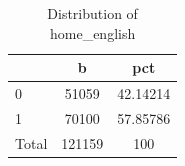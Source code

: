 \begin{table}[htbp]\centering
\def\sym#1{\ifmmode^{#1}\else\(^{#1}\)\fi}
\caption{Distribution of home\_english}
\begin{tabular}{l*{1}{cc}}
\hline\hline
                    &           b&         pct\\
\hline
0                   &       51059&    42.14214\\
1                   &       70100&    57.85786\\
Total               &      121159&         100\\
\hline\hline
\end{tabular}
\end{table}
